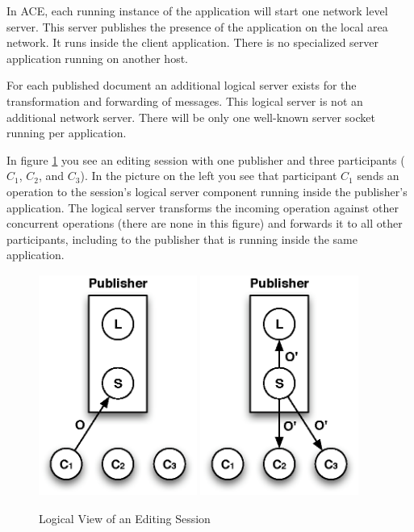 \documentclass[11pt,a4paper]{article}
\begin{document}
In ACE, each running instance of the application will start one network level
server. This server publishes the presence of the application on the local
area network. It runs inside the client application. There is no specialized 
server application running on another host.

For each published document an additional logical server exists for the 
transformation and forwarding of messages. This logical server is not an 
additional network server. There will be only one well-known server
socket running per application.

In figure \ref{fig:session} you see an editing session with one publisher 
and three participants ($C_{1}$, $C_{2}$, and $C_{3}$). In the picture on
the left you see that participant $C_{1}$ sends an operation to the
session's logical server component running inside the publisher's application.
The logical server transforms the incoming operation against other concurrent
operations (there are none in this figure) and forwards it to all other
participants, including to the publisher that is running inside the same
application.

\begin{figure}[H]
 \centering
 \includegraphics[width=5.18cm,height=7.26cm]{../images/session-1.eps}
 \includegraphics[width=5.18cm,height=7.26cm]{../images/session-2.eps}
 \caption{Logical View of an Editing Session}
 \label{fig:session}
\end{figure}
\end{document}
